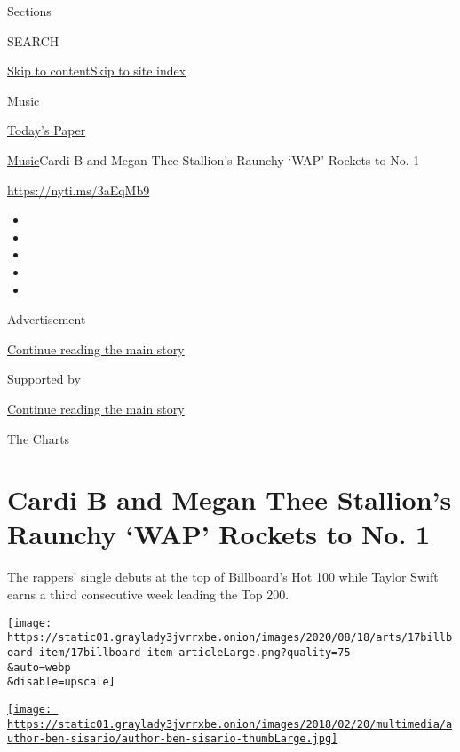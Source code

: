 Sections

SEARCH

\protect\hyperlink{site-content}{Skip to
content}\protect\hyperlink{site-index}{Skip to site index}

\href{https://www.nytimes3xbfgragh.onion/section/arts/music}{Music}

\href{https://myaccount.nytimes3xbfgragh.onion/auth/login?response_type=cookie\&client_id=vi}{}

\href{https://www.nytimes3xbfgragh.onion/section/todayspaper}{Today's
Paper}

\href{/section/arts/music}{Music}\textbar{}Cardi B and Megan Thee
Stallion's Raunchy `WAP' Rockets to No. 1

\url{https://nyti.ms/3aEqMb9}

\begin{itemize}
\item
\item
\item
\item
\item
\end{itemize}

Advertisement

\protect\hyperlink{after-top}{Continue reading the main story}

Supported by

\protect\hyperlink{after-sponsor}{Continue reading the main story}

The Charts

\hypertarget{cardi-b-and-megan-thee-stallions-raunchy-wap-rockets-to-no-1}{%
\section{Cardi B and Megan Thee Stallion's Raunchy `WAP' Rockets to No.
1}\label{cardi-b-and-megan-thee-stallions-raunchy-wap-rockets-to-no-1}}

The rappers' single debuts at the top of Billboard's Hot 100 while
Taylor Swift earns a third consecutive week leading the Top 200.

\texttt{[image: https://static01.graylady3jvrrxbe.onion/images/2020/08/18/arts/17billboard-item/17billboard-item-articleLarge.png?quality=75\\\&auto=webp\\\&disable=upscale]}

\href{https://www.nytimes3xbfgragh.onion/by/ben-sisario}{\texttt{[image: https://static01.graylady3jvrrxbe.onion/images/2018/02/20/multimedia/author-ben-sisario/author-ben-sisario-thumbLarge.jpg]}}

